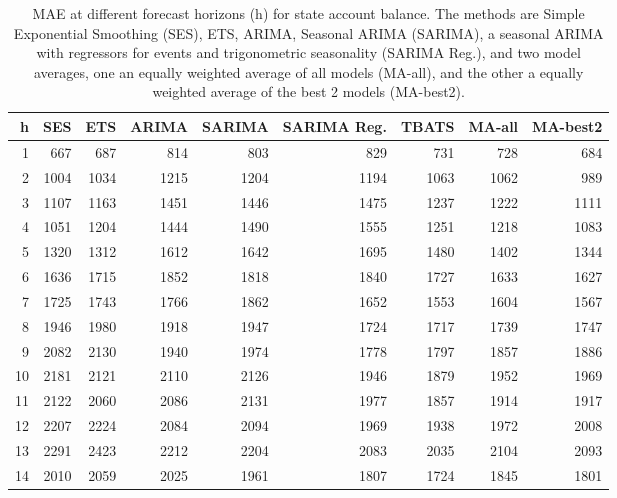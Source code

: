 \begin{table}[ht]
\centering
\begin{tabular}{rrrrrrrrr}
  \hline
h & SES & ETS & ARIMA & SARIMA & SARIMA Reg. & TBATS & MA-all & MA-best2 \\ 
  \hline
1 & 667 & 687 & 814 & 803 & 829 & 731 & 728 & 684 \\ 
  2 & 1004 & 1034 & 1215 & 1204 & 1194 & 1063 & 1062 & 989 \\ 
  3 & 1107 & 1163 & 1451 & 1446 & 1475 & 1237 & 1222 & 1111 \\ 
  4 & 1051 & 1204 & 1444 & 1490 & 1555 & 1251 & 1218 & 1083 \\ 
  5 & 1320 & 1312 & 1612 & 1642 & 1695 & 1480 & 1402 & 1344 \\ 
  6 & 1636 & 1715 & 1852 & 1818 & 1840 & 1727 & 1633 & 1627 \\ 
  7 & 1725 & 1743 & 1766 & 1862 & 1652 & 1553 & 1604 & 1567 \\ 
  8 & 1946 & 1980 & 1918 & 1947 & 1724 & 1717 & 1739 & 1747 \\ 
  9 & 2082 & 2130 & 1940 & 1974 & 1778 & 1797 & 1857 & 1886 \\ 
  10 & 2181 & 2121 & 2110 & 2126 & 1946 & 1879 & 1952 & 1969 \\ 
  11 & 2122 & 2060 & 2086 & 2131 & 1977 & 1857 & 1914 & 1917 \\ 
  12 & 2207 & 2224 & 2084 & 2094 & 1969 & 1938 & 1972 & 2008 \\ 
  13 & 2291 & 2423 & 2212 & 2204 & 2083 & 2035 & 2104 & 2093 \\ 
  14 & 2010 & 2059 & 2025 & 1961 & 1807 & 1724 & 1845 & 1801 \\ 
   \hline
\end{tabular}
\caption{MAE at different forecast horizons (h) for state account balance. The methods are Simple Exponential Smoothing (SES), ETS, ARIMA, Seasonal ARIMA (SARIMA), a seasonal ARIMA with regressors for events and trigonometric seasonality (SARIMA Reg.), and two model averages, one an equally weighted average of all models (MA-all), and the other a equally weighted average of the best 2 models (MA-best2).} 
\label{tab:maesab}
\end{table}


